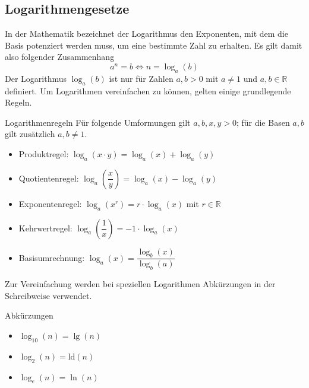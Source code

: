 \subsection{Logarithmengesetze}
In der Mathematik bezeichnet der Logarithmus den Exponenten, mit dem die Basis potenziert werden muss, um eine bestimmte Zahl zu erhalten. Es gilt damit also folgender Zusammenhang $$a^n = b \Leftrightarrow n = \log_a (b)$$
Der Logarithmus $\log_a(b)$ ist nur für Zahlen $a,b>0$ mit $a\neq 1$ und $a,b\in\mathds{R}$ definiert. Um Logarithmen vereinfachen zu können, gelten einige grundlegende Regeln. 
\begin{merke}{Logarithmenregeln}{}
Für folgende Umformungen gilt $a,b,x,y > 0$; für die Basen $a,b$ gilt zusätzlich $a,b \neq 1$.
\begin{itemize}
    \item Produktregel: $\log_a{(x\cdot y)} = \log_a{(x)} + \log_a{(y)}$
    \item Quotientenregel: $\log_a{\left(\dfrac{x}{y}\right)}= \log_a{(x)} -\log_a{(y)}$
    \item Exponentenregel: $\log_a{(x^r)} = r\cdot \log_a{(x)}$ mit $r\in \mathds{R}$
    \item Kehrwertregel: $\log_a{\left(\dfrac{1}{x}\right)} = -1\cdot\log_a{(x)}$
    \item Basisumrechnung: $\log_a{(x)} = \dfrac{\log_b{(x)}}{\log_b{(a)}}$
\end{itemize}
\end{merke}
Zur Vereinfachung werden bei speziellen Logarithmen Abkürzungen in der Schreibweise verwendet.
\begin{bem}{Abkürzungen}{}\label{ln}
    \begin{itemize}
        \item $\log_{10}{(n)} = \lg{(n)}$ 
        \item $\log_{2}{(n)} = \text{ld}{(n)}$
        \item $\log_{e}{(n)} = \ln{(n)}$
    \end{itemize}
\end{bem}
